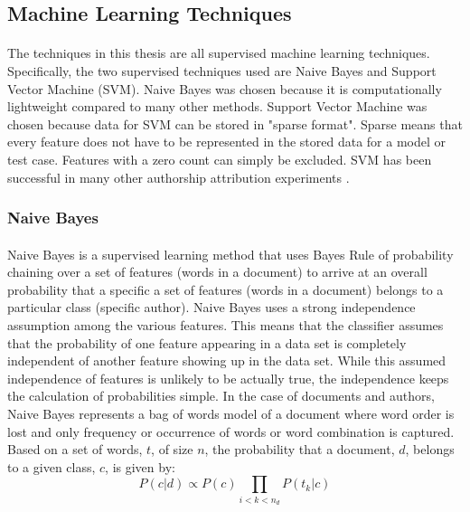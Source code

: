 	\subsection {Machine Learning Techniques}
		\paragraph{}The techniques in this thesis are all supervised machine learning techniques.  Specifically, the two supervised techniques used are Naive Bayes and Support Vector Machine (SVM).  Naive Bayes was chosen because it is computationally lightweight compared to many other methods.  Support Vector Machine was chosen because data for SVM can be stored in "sparse format".  Sparse means that every feature does not have to be represented in the stored data for a model or test case.  Features with a zero count can simply be excluded.  SVM has been successful in many other authorship attribution experiments \cite{jurafsky_speech_2009}.

		\subsubsection{Naive Bayes}
			\paragraph{} Naive Bayes is a supervised learning method that uses Bayes Rule of probability chaining over a set of features (words in a document) to arrive at an overall probability that a specific a set of features (words in a document) belongs to a particular class (specific author). Naive Bayes uses a strong independence assumption among the various features.  This means that the classifier assumes that the probability of one feature appearing in a data set is completely independent of another feature showing up in the data set.  While this assumed independence of features is unlikely to be actually true, the independence keeps the calculation of probabilities simple.  In the case of documents and authors, Naive Bayes represents a bag of words model of a document where word order is lost and only frequency or occurrence of words or word combination is captured. Based on a set of words, $t$, of size $n$, the probability that a document, $d$, belongs to a given class, $c$, is given by:
				\begin{equation} P(c|d) \propto P(c) \prod_{i<k<n_d} P(t_k|c) \end{equation}

